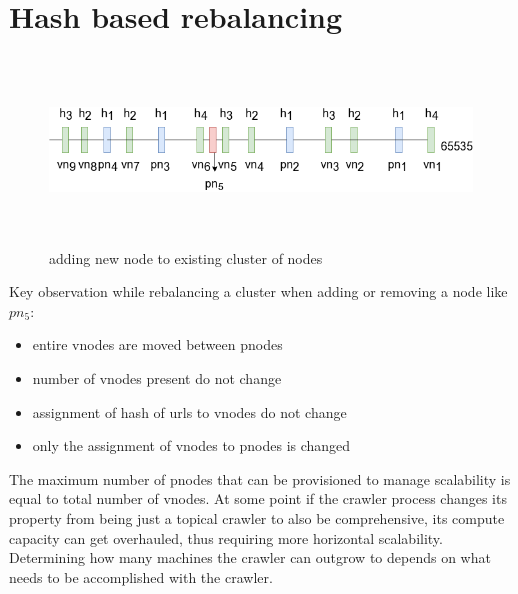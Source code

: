 \pagebreak

\section{Hash based rebalancing}
\begin{figure}[h!]
  \centering
  \includegraphics[width=12cm,height=5cm,keepaspectratio]{../media/crawler/addingnode.png}
  \caption{adding new node to existing cluster of nodes}
  \label{fig:addingnode}
\end{figure}

\noindent
Key observation while rebalancing a cluster when adding or removing a node like $pn_5$:
\begin{itemize}
  \item entire vnodes are moved between pnodes
  \item number of vnodes present do not change 
  \item assignment of hash of urls to vnodes do not change
  \item only the assignment of vnodes to pnodes is changed
\end{itemize}

\noindent
The maximum number of pnodes that can be provisioned to manage scalability is equal to total number of
vnodes. At some point if the crawler process changes its property from being just a topical crawler to
also be comprehensive, its compute capacity can get overhauled, thus requiring more horizontal scalability.
Determining how many machines the crawler can outgrow to depends on what needs to be accomplished with the crawler.

\pagebreak


